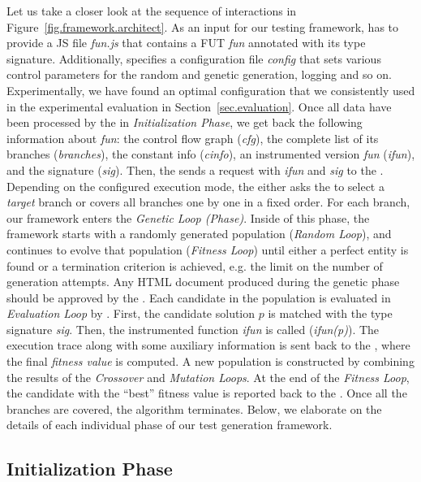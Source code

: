 Let us take a closer look at the sequence of interactions in Figure~\ref{fig.framework.architect}. As an input for our testing framework, \User has to provide a JS file \emph{fun.js} that contains a FUT \emph{fun} annotated with its type signature. Additionally, \User specifies a configuration file \emph{config} that sets various control parameters for the random and genetic generation, logging and so on. Experimentally, we have found an optimal configuration that we consistently used in the experimental evaluation in Section~\ref{sec.evaluation}. Once all data have been processed by the \Server in \emph{Initialization Phase}, we get back the following information about \emph{fun}: the control flow graph (\emph{cfg}), the complete list of its branches (\emph{branches}), the constant info (\emph{cinfo}), an instrumented version \emph{fun} (\emph{ifun}), and the signature (\emph{sig}). Then, the \Server sends a  request with \emph{ifun} and \emph{sig} to the \Client. Depending on the configured execution mode, the \Server either asks the \User to select a \emph{target} branch or covers all branches one by one in a fixed order. For each branch, our framework enters the \emph{Genetic Loop (Phase)}. Inside of this phase, the framework starts with a randomly generated population (\emph{Random Loop}), and continues to evolve that population (\emph{Fitness Loop}) until either a perfect entity is found or a termination criterion is achieved, e.g. the limit on the number of generation attempts. Any HTML document produced during the genetic phase should be approved by the \Validator. Each candidate in the population is evaluated in \emph{Evaluation Loop} by \Client. First, the candidate solution $p$ is matched with the type signature \emph{sig}. Then, the instrumented function \emph{ifun} is called (\emph{ifun(p)}). The execution trace along with some auxiliary information is sent back to the \Server, where the final \emph{fitness value} is computed. A new population is constructed by combining the results of the \emph{Crossover} and \emph{Mutation Loops}. At the end of the \emph{Fitness Loop}, the candidate with the ``best'' fitness value is reported back to the \User. Once all the branches are covered, the algorithm terminates. Below, we elaborate on the details of each individual phase of our test generation framework.

\subsection{Initialization Phase}
\label{sub.sec.init.phase}


